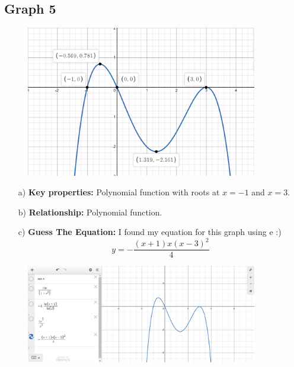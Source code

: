 \documentclass{article}
\begin{document}
\subsection{Graph 5}
\begin{figure}[h]
    \centering
    \includegraphics[width=0.9\textwidth]{imgs/imgs FSE/g_5.png}
    \label{fig:image}
\end{figure}
\begin{enumerate}
    \item[a)] \textbf{Key properties:} Polynomial function with roots at $x = -1$ and $x = 3$.
    \item[b)]  \textbf{Relationship:} Polynomial function.
    \item[c)] \textbf{Guess The Equation: } I found my equation for this graph using e :) $$y=-\frac{\left(x+1\right)x\left(x-3\right)^{2}}{4}$$
\end{enumerate}

\begin{figure}[h]
    \centering
    \includegraphics[width=0.9\textwidth]{imgs/imgs FSE/-(x+1)x(x-3)^2_4.png}
    \label{fig:image}
\end{figure}
\newpage
\end{document}
